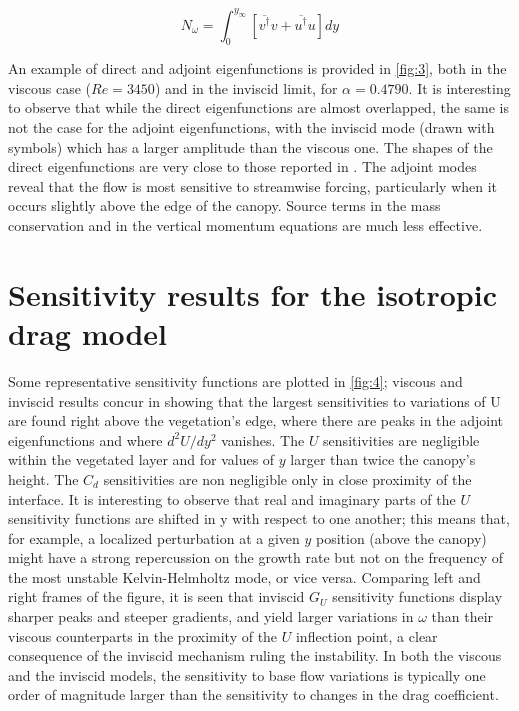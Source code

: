 \begin{equation}
N_{\omega} = \int_0^{y_{\infty}} \left[ \overline{ v^{\dagger}} v  +  \overline{ u^{\dagger}} u \right] dy
\label{eq:norm}
\end{equation}

An example of direct and adjoint eigenfunctions is provided in \ref{fig:3}, both in the viscous case
($Re = 3450$) and in the inviscid limit, for $\alpha = 0.4790$. It is interesting to observe that while the
direct eigenfunctions are almost overlapped, the same is not the case for the adjoint eigenfunctions,
with the inviscid mode (drawn with symbols) which has a larger amplitude than the viscous one.
The shapes of the direct eigenfunctions are very close to those reported in \citet{zampogna2016instability}. The adjoint modes
reveal that the flow is most sensitive to streamwise forcing, particularly when it occurs slightly
above the edge of the canopy. Source terms in the mass conservation and in the vertical momentum
equations are much less effective.


\section{Sensitivity results for the isotropic drag model}
\label{sec:3}

Some representative sensitivity functions are plotted in \ref{fig:4}; viscous and inviscid results
concur in showing that the largest sensitivities to variations of U are found right above the vegetation’s edge, where there are peaks in the adjoint eigenfunctions and where $d^2 U/d y^2$ vanishes. The
$U$ sensitivities are negligible within the vegetated layer and for values of $y$ larger than twice the
canopy’s height. The $C_d$ sensitivities are non negligible only in close proximity of the interface.
It is interesting to observe that real and imaginary parts of the $U$ sensitivity functions are
shifted in y with respect to one another; this means that, for example, a localized perturbation at
a given $y$ position (above the canopy) might have a strong repercussion on the growth rate but not
on the frequency of the most unstable Kelvin-Helmholtz mode, or vice versa. Comparing left and
right frames of the figure, it is seen that inviscid $G_U$ sensitivity functions display sharper peaks and
steeper gradients, and yield larger variations in $\omega$ than their viscous counterparts in the proximity of
the $U$ inflection point, a clear consequence of the inviscid mechanism ruling the instability. In both
the viscous and the inviscid models, the sensitivity to base flow variations is typically one order of
magnitude larger than the sensitivity to changes in the drag coefficient.

